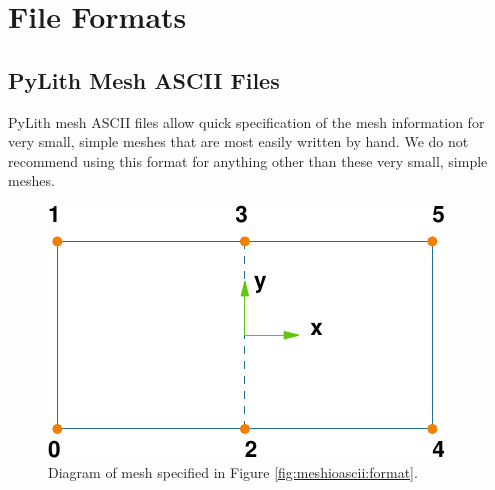 \chapter{File Formats}
\label{cha:formats}

\section{PyLith Mesh ASCII Files}
\label{sec:MeshIOAscii}

PyLith mesh ASCII files allow quick specification of the mesh information
for very small, simple meshes that are most easily written by hand.
We do not recommend using this format for anything other than these
very small, simple meshes.

\noindent \begin{center}
\begin{figure}[H]
\noindent \begin{centering}
\includegraphics{fileformats/figs/meshquad4}
\par\end{centering}

\caption{Diagram of mesh specified in Figure \vref{fig:meshioascii:format}.\label{fig:meshioascii:diagram}}
\end{figure}

\par\end{center}
